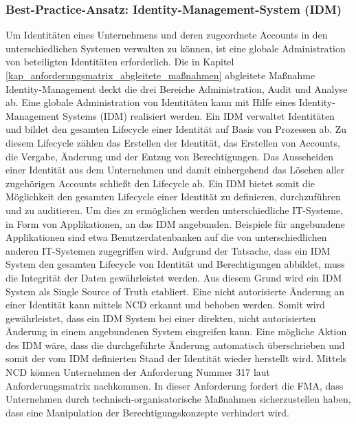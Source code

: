 \subsubsection{Best-Practice-Ansatz: Identity-Management-System (IDM)}
Um Identitäten eines Unternehmens und deren zugeordnete Accounts in den unterschiedlichen Systemen verwalten zu können, ist eine globale Administration von beteiligten Identitäten erforderlich. Die in Kapitel \ref{kap_anforderungsmatrix_abgleitete_maßnahmen} abgleitete Maßnahme \glqq{}Identity-Management\grqq{} deckt die drei Bereiche \glqq{}Administration\grqq{}, \glqq{}Audit\grqq{} und \glqq{}Analyse\grqq{} ab. Eine globale Administration von Identitäten kann mit Hilfe eines \glqq{}Identity-Management Systems\grqq{} (IDM) realisiert werden. Ein IDM verwaltet Identitäten und bildet den gesamten Lifecycle einer Identität auf Basis von Prozessen ab. Zu diesem Lifecycle zählen das Erstellen der Identität, das Erstellen von Accounts, die Vergabe, Änderung und der Entzug von Berechtigungen. Das Ausscheiden einer Identität aus dem Unternehmen und damit einhergehend das Löschen aller zugehörigen Accounts schließt den Lifecycle ab. Ein IDM bietet somit die Möglichkeit den gesamten Lifecycle einer Identität zu definieren, durchzuführen und zu auditieren. Um dies zu ermöglichen werden unterschiedliche IT-Systeme, in Form von \glqq{}Applikationen\grqq{}, an das IDM angebunden. Beispiele für angebundene Applikationen sind etwa Benutzerdatenbanken auf die von unterschiedlichen anderen IT-Systemen zugegriffen wird. 
\bigbreak
Aufgrund der Tatsache, dass ein IDM System den gesamten Lifecycle von Identität und Berechtigungen abbildet, muss die Integrität der Daten gewährleistet werden. Aus diesem Grund wird ein IDM System als \glqq{}Single Source of Truth\grqq{} etabliert. Eine nicht autorisierte Änderung an einer Identität kann mittels NCD erkannt und behoben werden. Somit wird gewährleistet, dass ein IDM System bei einer direkten, nicht autorisierten Änderung in einem angebundenen System eingreifen kann. Eine mögliche Aktion des IDM wäre, dass die durchgeführte Änderung automatisch überschrieben und somit der vom IDM definierten Stand der Identität wieder herstellt wird. Mittels NCD können Unternehmen der Anforderung Nummer 317 laut Anforderungsmatrix nachkommen. In dieser Anforderung fordert die FMA, dass Unternehmen durch technisch-organisatorische Maßnahmen sicherzustellen haben, dass eine Manipulation der Berechtigungskonzepte verhindert wird.\\

